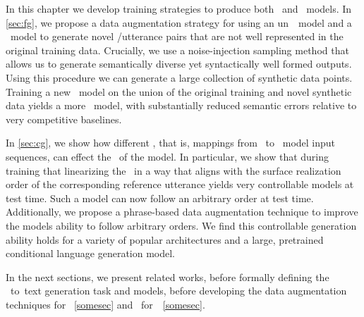 In this chapter we develop training strategies to produce both \faithful~and
\controllablegeneration~models. In \autoref{sec:fg}, we propose a 
data augmentation strategy for using an 
un\faithful~\naturallanguagegeneration~model and 
a \naturallanguageunderstanding~model to 
generate novel \meaningrepresentation/utterance pairs that are not well
represented in the original training data. Crucially, we use a noise-injection
sampling method that allows us to generate semantically diverse 
yet syntactically well formed outputs. Using this procedure we can generate
a large collection of synthetic data points. Training a new 
\sequencetosequence~model on the union of the original training and novel
synthetic data yields a more \faithfulgeneration~model, with substantially
reduced semantic errors relative to very competitive baselines. 


In \autoref{sec:cg}, we show how different \linearizationstrategies,
that is, mappings from \meaningrepresentation~to 
\naturallanguagegeneration~model input sequences, can effect the 
\faithfulness~of the model. In particular, we show that during training that
linearizing the \meaningrepresentation~in a way that aligns with the surface
realization order of the corresponding reference utterance yields very 
controllable models at test time. Such a model can now follow an arbitrary
order at test time. Additionally, we propose a phrase-based data augmentation
technique to improve the models ability to follow arbitrary orders. We find
this controllable generation ability holds for a variety of popular architectures and a large, pretrained conditional language generation model.


In the next sections, we present related works, before formally defining the 
\meaningrepresentation~to~text generation task and models, before developing
the data augmentation techniques for \faithfulgeneration~\autoref{somesec} 
and \linearizationstrategies~for~\controllablegeneration~\autoref{somesec}.


 


